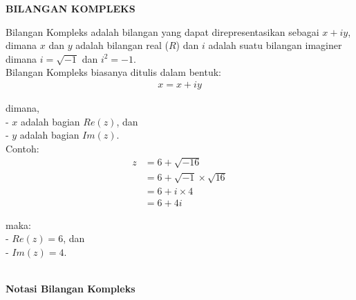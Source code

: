 \documentclass{article}
\begin{document}
    \begin{center}
        \textbf{BILANGAN KOMPLEKS}
    \end{center}

    Bilangan Kompleks adalah bilangan yang dapat direpresentasikan sebagai \( x + iy \), dimana $x$ dan $y$ adalah bilangan real ($R$) dan $i$ adalah suatu bilangan imaginer dimana \( i = \sqrt{-1} \) dan \( i^2 = -1 \).\\

    Bilangan Kompleks biasanya ditulis dalam bentuk:
    \begin{align}
        x = x + iy
    \end{align}

    \>dimana,\\
    - $x$ adalah bagian $Re(z)$, dan\\
    - $y$ adalah bagian $Im(z)$.\\

    Contoh:
    \begin{align}
        z & = 6 + \sqrt{-16} 
        \nonumber\\
        & = 6 + \sqrt{-1} \times \sqrt{16}
        \nonumber\\
        & = 6 + i \times 4
        \nonumber\\
        & = 6 + 4i
    \end{align}

    maka:\\
    -   $Re(z) = 6$, dan\\
    -   $Im(z) = 4$.\\\\

    \begin{center}
        \textbf{Notasi Bilangan Kompleks}
    \end{center}
    
\end{document}
